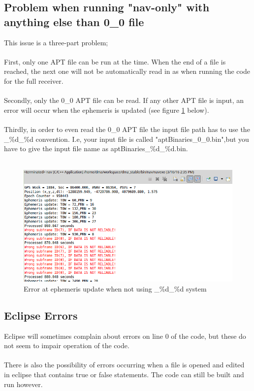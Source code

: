 \documentclass[10pt,a4paper]{article}
\begin{document}
\subsection{Problem when running "nav-only" with anything else than 0\_0 file}
This issue is a three-part problem; \\ \\
First, only one APT file can be run at the time. When the end of a file is reached, the next one will not be automatically read in as when running the code for the full receiver. \\ \\
Secondly, only the 0\_0 APT file can be read. If any other APT file is input, an error will occur when the ephemeris is updated (see figure \ref{fig:error} below). \\ \\
Thirdly, in order to even read the 0\_0 APT file the input file path has to use the \_\%d\_\%d convention. I.e, your input file is called "aptBinaries\_0\_0.bin",but you have to give the input file name as aptBinaries\_\%d\_\%d.bin.\\ \\

\begin{figure}[h!]
\centering
\includegraphics[scale=0.6]{error}
\caption{Error at ephemeris update when not using \_\%d\_\%d system}
\label{fig:error}
\end{figure}
\label{sec:prob0}


\subsection{Eclipse Errors}
Eclipse will sometimes complain about errors on line 0 of the code, but these do not seem to impair operation of the code. \\ \\
\noindent
There is also the possibility of errors occurring when a file is opened and edited in eclipse that contains true or false statements. The code can still be built and run however.
\end{document}

